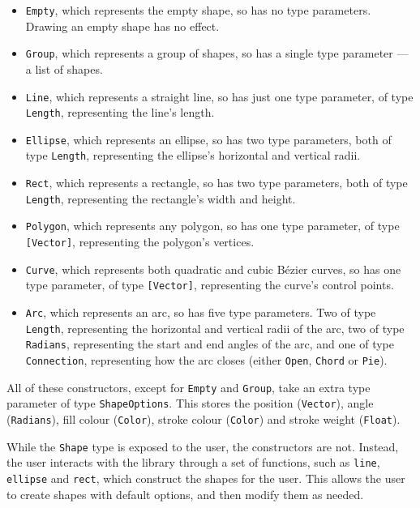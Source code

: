 \documentclass[../main.tex]{subfiles}
\begin{document}
            \begin{itemize}
                \item \verb|Empty|, which represents the empty shape, so has no type
                      parameters.
                      Drawing an empty shape has no effect.
                \item \verb|Group|, which represents a group of shapes, so has a single type
                      parameter — a list of shapes.
                \item \verb|Line|, which represents a straight line, so has just one type
                      parameter, of type \verb|Length|, representing the line's length.
                \item \verb|Ellipse|, which represents an ellipse, so has two type parameters,
                      both of type \verb|Length|, representing the ellipse's horizontal and vertical
                      radii.
                \item \verb|Rect|, which represents a rectangle, so has two type parameters, both
                      of type \verb|Length|, representing the rectangle's width and height.
                \item \verb|Polygon|, which represents any polygon, so has one type parameter, of
                      type \verb|[Vector]|, representing the polygon's vertices.
                \item \verb|Curve|, which represents both quadratic and cubic Bézier curves, so has
                      one type parameter, of type \verb|[Vector]|, representing the curve's control
                      points.
                \item \verb|Arc|, which represents an arc, so has five type parameters.
                      Two of type \verb|Length|, representing the horizontal and vertical radii of
                          the arc, two of type \verb|Radians|, representing the start and end angles of
                          the arc, and one of type \verb|Connection|, representing how the arc closes
                          (either \verb|Open|, \verb|Chord| or \verb|Pie|).
            \end{itemize}

            All of these constructors, except for \verb|Empty| and \verb|Group|, take an
                extra type parameter of type \verb|ShapeOptions|.
            This stores the position (\verb|Vector|), angle (\verb|Radians|), fill colour
                (\verb|Color|), stroke colour (\verb|Color|) and stroke weight (\verb|Float|).

            While the \verb|Shape| type is exposed to the user, the constructors are not.
            Instead, the user interacts with the library through a set of functions, such
                as \verb|line|, \verb|ellipse| and \verb|rect|, which construct the shapes for
                the user.
            This allows the user to create shapes with default options, and then modify
                them as needed.
\end{document}

